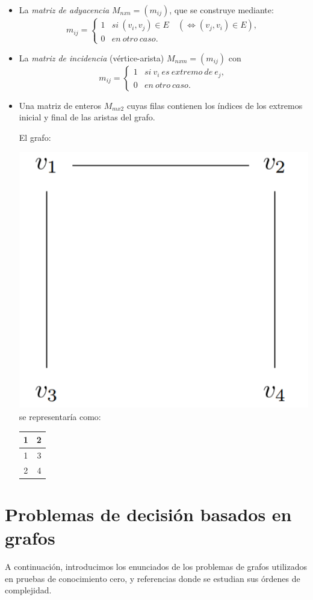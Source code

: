 \begin{itemize}
	\item  La \textit{matriz de adyacencia} $M_{nxn} = (m_{ij})$, que se construye mediante:
	\[
	m_{ij} =
	\begin{cases}
	1 & si\ (v_i,v_j) \in E \quad ( \Leftrightarrow (v_j,v_i)\in E ), \\
	0 & en\ otro\ caso.
	\end{cases}
	\]
	
	\item La \textit{matriz de incidencia} (vértice-arista) $M_{nxm} = (m_{ij})$ con
	\[
	m_{ij} =
	\begin{cases}
	1 & si\ v_i\ es\ extremo\ de\ e_j, \\
	0 & en\ otro\ caso.
	\end{cases}
	\]
	
	\item Una matriz de enteros $M_{mx2}$ cuyas filas contienen los índices de los extremos inicial y final de las aristas del grafo.
	
	\begin{example}
		El grafo:
		
		\includegraphics[width=.2\linewidth]{gfx/exgraph}
		\qquad se representaría como: \qquad
		\begin{tabular}{|c|c|}
			\hline	1 & 2 \\ \hline 1 & 3 \\ \hline 2 & 4 \\ \hline
		\end{tabular}	
		
	\end{example}
	
\end{itemize}



\section{Problemas de decisión basados en grafos}

A continuación, introducimos los enunciados de los problemas de grafos utilizados en pruebas de conocimiento cero, y referencias donde se estudian sus órdenes de complejidad.

